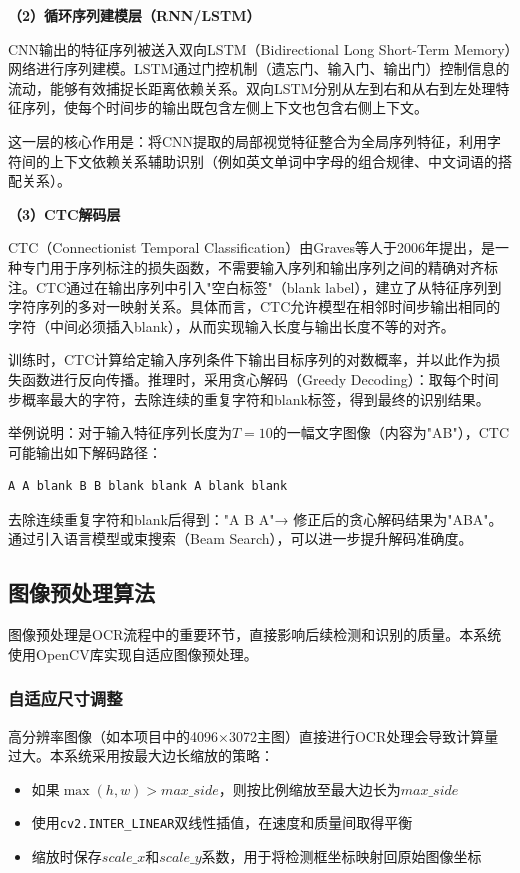 \documentclass[12pt,hyperref,a4paper,UTF8]{ctexart}
\begin{document}
\textbf{（2）循环序列建模层（RNN/LSTM）}

CNN输出的特征序列被送入双向LSTM（Bidirectional Long Short-Term Memory）网络进行序列建模。LSTM通过门控机制（遗忘门、输入门、输出门）控制信息的流动，能够有效捕捉长距离依赖关系。双向LSTM分别从左到右和从右到左处理特征序列，使每个时间步的输出既包含左侧上下文也包含右侧上下文。

这一层的核心作用是：将CNN提取的局部视觉特征整合为全局序列特征，利用字符间的上下文依赖关系辅助识别（例如英文单词中字母的组合规律、中文词语的搭配关系）。

\textbf{（3）CTC解码层}

CTC（Connectionist Temporal Classification）由Graves等人于2006年提出，是一种专门用于序列标注的损失函数，不需要输入序列和输出序列之间的精确对齐标注。CTC通过在输出序列中引入"空白标签"（blank label），建立了从特征序列到字符序列的多对一映射关系。具体而言，CTC允许模型在相邻时间步输出相同的字符（中间必须插入blank），从而实现输入长度与输出长度不等的对齐。

训练时，CTC计算给定输入序列条件下输出目标序列的对数概率，并以此作为损失函数进行反向传播。推理时，采用贪心解码（Greedy Decoding）：取每个时间步概率最大的字符，去除连续的重复字符和blank标签，得到最终的识别结果。

举例说明：对于输入特征序列长度为$T=10$的一幅文字图像（内容为"AB"），CTC可能输出如下解码路径：

\begin{verbatim}
A A blank B B blank blank A blank blank
\end{verbatim}

去除连续重复字符和blank后得到："A B A"→ 修正后的贪心解码结果为"ABA"。通过引入语言模型或束搜索（Beam Search），可以进一步提升解码准确度。

\subsection{图像预处理算法}

图像预处理是OCR流程中的重要环节，直接影响后续检测和识别的质量。本系统使用OpenCV库实现自适应图像预处理。

\subsubsection{自适应尺寸调整}

高分辨率图像（如本项目中的4096×3072主图）直接进行OCR处理会导致计算量过大。本系统采用按最大边长缩放的策略：

\begin{itemize}
    \item 如果$\max(h, w) > max\_side$，则按比例缩放至最大边长为$max\_side$
    \item 使用\texttt{cv2.INTER\_LINEAR}双线性插值，在速度和质量间取得平衡
    \item 缩放时保存$scale\_x$和$scale\_y$系数，用于将检测框坐标映射回原始图像坐标
\end{itemize}
\end{document}
